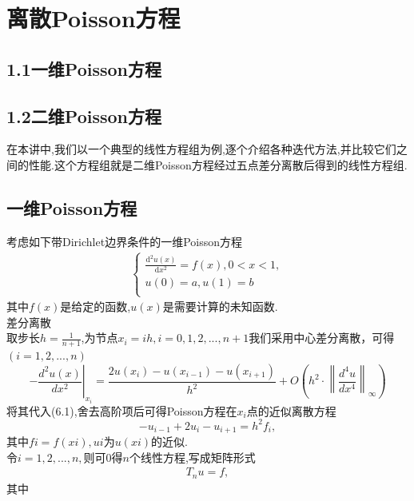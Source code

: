 \documentclass[12pt,a4paper]{article}
\begin{document}
\section{\color{blue} 离散Poisson方程}
\subsection*{\color{blue}1.1\quad 一维Poisson方程}
\subsection*{\color{blue}1.2\quad 二维Poisson方程}
在本讲中,我们以一个典型的线性方程组为例,逐个介绍各种迭代方法,并比较它们之间的性能.这个方程组就是二维Poisson方程经过五点差分离散后得到的线性方程组.\\
\subsection{\color{blue}一维Poisson方程}
考虑如下带Dirichlet边界条件的一维Poisson方程
\begin{align}
	\begin{cases}
		\frac{\mathrm{d^2} u(x)}{\mathrm{d}x^2} =f(x),0<x<1,\\
		u(0)=a,u(1) = b\\
	\end{cases}
	\tag{6.1}
\end{align}
其中$f(x)$是给定的函数,$u(x)$是需要计算的未知函数.\\
 差分离散\\
取步长$h=\frac{1}{n+1}$,为节点$x_i=ih,i=0,1,2,...,n+1$我们采用中心差分离散，可得$(i=1,2,...,n)$
$$
-\left.\frac{d^{2} u(x)}{d x^{2}}\right|_{x_{i}}=\frac{2 u\left(x_{i}\right)-u\left(x_{i-1}\right)-u\left(x_{i+1}\right)}{h^{2}}+O\left(h^{2} \cdot\left\|\frac{d^{4} u}{d x^{4}}\right\|_{\infty}\right)
$$
将其代入(6.1),舍去高阶项后可得Poisson方程在$x_i$点的近似离散方程
$$\boxed{-u_{i-1}+2u_i-u_{i+1}=h^2f_i,}$$
其中$fi=f(xi),ui$为$u(xi)$的近似.\\
令$i= 1,2,...,n,$则可0得$n$个线性方程,写成矩阵形式
\begin{align}
	{T_nu=f,}
	\tag{6.2}
\end{align}
其中
\end{document}
